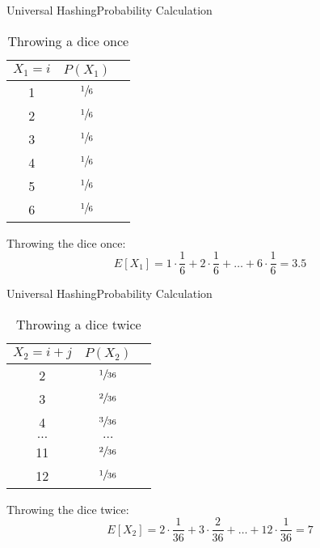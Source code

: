 
\begin{frame}{Universal Hashing}{Probability Calculation}
  \vspace*{-1.5em}
  \begin{table}[!h]
    \caption{Throwing a dice once}
    \label{tab:probabilities:value_rolling_dice_once}
    \begin{tabularx}{0.25\linewidth}{c|cc}
      $X_1 = i$ & $P(X_1)$\\
      \midrule
      1 & $\sfrac{1}{6}$\\
      2 & $\sfrac{1}{6}$\\
      3 & $\sfrac{1}{6}$\\
      4 & $\sfrac{1}{6}$\\
      5 & $\sfrac{1}{6}$\\
      6 & $\sfrac{1}{6}$\\
    \end{tabularx}
  \end{table}
  Throwing the dice once:
  \[E[X_1] = 1 \cdot \frac{1}{6} + 2 \cdot \frac{1}{6}
    + \dots + 6 \cdot \frac{1}{6} = 3.5\]
\end{frame}


\begin{frame}{Universal Hashing}{Probability Calculation}
  \vspace*{-1.5em}
  \begin{table}[!h]
    \caption{Throwing a dice twice}
    \label{tab:probabilities:value_rolling_dice_twice}
    \begin{tabularx}{0.275\linewidth}{c|cc}
      $X_2 = i + j$ & $P(X_2)$\\
      \midrule
      2 & $\sfrac{1}{36}$\\
      3 & $\sfrac{2}{36}$\\
      4 & $\sfrac{3}{36}$\\
      $\dots$ & $\dots$\\
      11 & $\sfrac{2}{36}$\\
      12 & $\sfrac{1}{36}$\\
    \end{tabularx}
  \end{table}
  Throwing the dice twice:
  \[E[X_2] = 2 \cdot \frac{1}{36} + 3 \cdot \frac{2}{36}
    + \dots + 12 \cdot \frac{1}{36} = 7\]
\end{frame}


